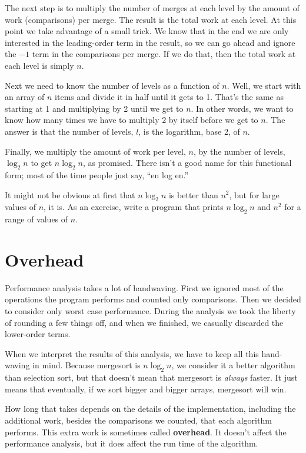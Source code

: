 \documentclass[12pt]{book}
\theoremstyle{exercise}
\begin{document}
The next step is to multiply the number of merges at each level
by the amount of work (comparisons) per merge.  The result is the
total work at each level.  At this point we take advantage of a small
trick.  We know that in the end we are only interested in the
leading-order term in the result, so we can go ahead
and ignore the $-1$ term in the comparisons per merge.  If we do
that, then the total work at each level is simply $n$.

Next we need to know the number of levels as a function of $n$.  Well,
we start with an array of $n$ items and divide it in half until it
gets to 1.  That's the same as starting at 1 and multiplying by 2
until we get to $n$.  In other words, we want to know how many times
we have to multiply 2 by itself before we get to $n$.  The answer is
that the number of levels, $l$, is the logarithm, base 2, of $n$.

Finally, we multiply the amount of work per level, $n$, by the
number of levels, $\log_2 n$ to get $n \log_2 n$, as promised.
There isn't a good name for this functional form; most of the
time people just say, ``en log en.''

It might not be obvious at first that $n \log_2 n$ is better than
$n^2$, but for large values of $n$, it is.
As an exercise, write a program that prints $n \log_2 n$ and
$n^2$ for a range of values of $n$.


\section{Overhead}

Performance analysis takes a lot of handwaving.  First we ignored most
of the operations the program performs and counted only comparisons.
Then we decided to consider only worst case performance.  During the
analysis we took the liberty of rounding a few things off, and when we
finished, we casually discarded the lower-order terms.

When we interpret the results of this analysis, we have to keep
all this hand-waving in mind.  Because mergesort is $n \log_2 n$,
we consider it a better algorithm than selection sort, but that
doesn't mean that mergesort is {\em always} faster.  It just means
that eventually, if we sort bigger and bigger arrays, mergesort
will win.

How long that takes depends on the details of the implementation,
including the additional work, besides the comparisons we counted,
that each algorithm performs.  This extra work is sometimes called
{\bf overhead}.  It doesn't affect the performance analysis, but
it does affect the run time of the algorithm.
\end{document}
